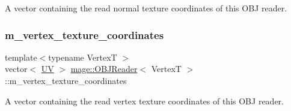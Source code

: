 A vector containing the read normal texture coordinates of this O\+BJ reader. \hypertarget{classmage_1_1_o_b_j_reader_aec7c093d380be0b8506f7b8fdf9c3ad1}{}\label{classmage_1_1_o_b_j_reader_aec7c093d380be0b8506f7b8fdf9c3ad1} 
\subsubsection{\texorpdfstring{m\+\_\+vertex\+\_\+texture\+\_\+coordinates}{m\_vertex\_texture\_coordinates}}
{\footnotesize\ttfamily template$<$typename VertexT $>$ \\
vector$<$ \hyperlink{structmage_1_1_u_v}{UV} $>$ \hyperlink{classmage_1_1_o_b_j_reader}{mage\+::\+O\+B\+J\+Reader}$<$ VertexT $>$\+::m\+\_\+vertex\+\_\+texture\+\_\+coordinates\hspace{0.3cm}{\ttfamily [private]}}

A vector containing the read vertex texture coordinates of this O\+BJ reader. 